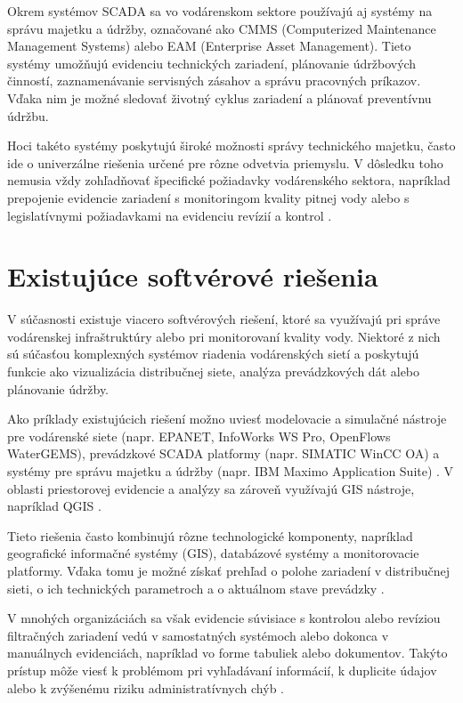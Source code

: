 Okrem systémov SCADA sa vo vodárenskom sektore používajú aj systémy na správu majetku a údržby, označované ako CMMS (Computerized Maintenance Management Systems) alebo EAM (Enterprise Asset Management). Tieto systémy umožňujú evidenciu technických zariadení, plánovanie údržbových činností, zaznamenávanie servisných zásahov a správu pracovných príkazov. Vďaka nim je možné sledovať životný cyklus zariadení a plánovať preventívnu údržbu.

Hoci takéto systémy poskytujú široké možnosti správy technického majetku, často ide o univerzálne riešenia určené pre rôzne odvetvia priemyslu. V dôsledku toho nemusia vždy zohľadňovať špecifické požiadavky vodárenského sektora, napríklad prepojenie evidencie zariadení s monitoringom kvality pitnej vody alebo s legislatívnymi požiadavkami na evidenciu revízií a kontrol \cite{EUDWD2020,SKVyhlaska912023}.

\section{Existujúce softvérové riešenia}

V súčasnosti existuje viacero softvérových riešení, ktoré sa využívajú pri správe vodárenskej infraštruktúry alebo pri monitorovaní kvality vody. Niektoré z nich sú súčasťou komplexných systémov riadenia vodárenských sietí a poskytujú funkcie ako vizualizácia distribučnej siete, analýza prevádzkových dát alebo plánovanie údržby.

Ako príklady existujúcich riešení možno uviesť modelovacie a simulačné nástroje pre vodárenské siete (napr. EPANET, InfoWorks WS Pro, OpenFlows WaterGEMS), prevádzkové SCADA platformy (napr. SIMATIC WinCC OA) a systémy pre správu majetku a údržby (napr. IBM Maximo Application Suite) \cite{EPANET,InfoWorksWSPro,OpenFlowsWaterGEMS,SiemensWinCCOA,IBMMaximo}. V oblasti priestorovej evidencie a analýzy sa zároveň využívajú GIS nástroje, napríklad QGIS \cite{QGISDocs}.

Tieto riešenia často kombinujú rôzne technologické komponenty, napríklad geografické informačné systémy (GIS), databázové systémy a monitorovacie platformy. Vďaka tomu je možné získať prehľad o polohe zariadení v distribučnej sieti, o ich technických parametroch a o aktuálnom stave prevádzky \cite{UVZPitnaVodaMapy,QGISDocs}.

V mnohých organizáciách sa však evidencie súvisiace s kontrolou alebo revíziou filtračných zariadení vedú v samostatných systémoch alebo dokonca v manuálnych evidenciách, napríklad vo forme tabuliek alebo dokumentov. Takýto prístup môže viesť k problémom pri vyhľadávaní informácií, k duplicite údajov alebo k zvýšenému riziku administratívnych chýb \cite{CarricoFerreira2021}.

